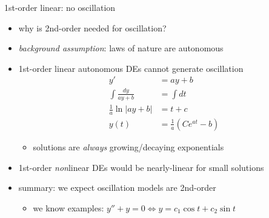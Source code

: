 \documentclass[urlcolor=blue,dvipsnames]{beamer}
\begin{document}
\begin{frame}{1st-order linear: no oscillation}

\begin{itemize}
\item why is 2nd-order needed for oscillation?
\item \emph{background assumption}: laws of nature are autonomous
\item 1st-order linear autonomous DEs cannot generate oscillation \small
\begin{align*}
y' &= a y + b \\
\int \frac{dy}{ay+b} &= \int dt \\
\frac{1}{a} \ln|ay+b| &= t+c \\
y(t) &= \frac{1}{a}\left(C e^{at} - b\right)
\end{align*}

\vspace{-3mm}
    \begin{itemize}
    \item solutions are \emph{always} growing/decaying exponentials
    \end{itemize}
\item 1st-order \emph{non}linear DEs would be nearly-linear for small solutions
\item summary: we expect oscillation models are 2nd-order
    \begin{itemize}
    \item we know examples: \footnotesize $y'' + y = 0 \iff y = c_1 \cos t + c_2 \sin t$
    \end{itemize}
\end{itemize}
\end{frame}
\end{document}
